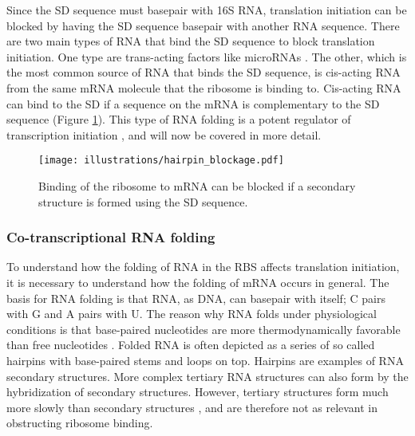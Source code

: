 Since the SD sequence must basepair with 16S RNA, translation initiation can
be blocked by having the SD sequence basepair with another RNA sequence. There
are two main types of RNA that bind the SD sequence to block translation
initiation. One type are trans-acting factors like microRNAs
\cite{storz_controlling_2004}. The other, which is the most common source of
RNA that binds the SD sequence, is cis-acting RNA from the same mRNA molecule
that the ribosome is binding to. Cis-acting RNA can bind to the SD if a
sequence on the mRNA is complementary to the SD sequence (Figure
\ref{fig:hairpin_blockage}).  This type of RNA folding is a potent regulator
of transcription initiation \cite{hall_role_1982, de_smit_secondary_1990}, and
will now be covered in more detail.

\begin{figure}[h]
	\begin{center}
		\texttt{[image: illustrations/hairpin\_blockage.pdf]}
	\end{center}
	\caption{Binding of the ribosome to mRNA can be blocked if a secondary
	structure is formed using the SD sequence.}
	\label{fig:hairpin_blockage}
\end{figure}

\subsubsection{Co-transcriptional RNA folding}
To understand how the folding of RNA in the RBS affects translation initiation,
it is necessary to understand how the folding of mRNA occurs in general. The
basis for RNA folding is that RNA, as DNA, can basepair with itself; C pairs
with G and A pairs with U. The reason why RNA folds under physiological
conditions is that base-paired nucleotides are more thermodynamically favorable
than free nucleotides \cite{onoa_rna_2004}. Folded RNA is often depicted as a
series of so called hairpins with base-paired stems and loops on top. Hairpins
are examples of RNA secondary structures. More complex tertiary RNA structures
can also form by the hybridization of secondary structures. However, tertiary
structures form much more slowly than secondary structures
\cite{onoa_rna_2004}, and are therefore not as relevant in obstructing
ribosome binding.

